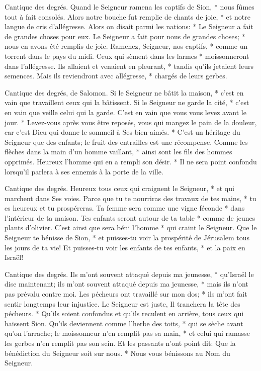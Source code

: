 Cantique des degrés. Quand le Seigneur ramena les captifs de Sion, * nous fûmes tout à fait consolés.
Alors notre bouche fut remplie de chants de joie, * et notre langue de cris d'allégresse. Alors on disait parmi les nations: * Le Seigneur a fait de grandes choses pour eux.
Le Seigneur a fait pour nous de grandes choses; * nous en avons été remplis de joie.
Ramenez, Seigneur, nos captifs, * comme un torrent dans le pays du midi.
Ceux qui sèment dans les larmes * moissonneront dans l'allégresse.
Ils allaient et venaient en pleurant, * tandis qu'ils jetaient leurs semences. Mais ils reviendront avec allégresse, * chargés de leurs gerbes.

Cantique des degrés, de Salomon. Si le Seigneur ne bâtit la maison, * c'est en vain que travaillent ceux qui la bâtissent. Si le Seigneur ne garde la cité, * c'est en vain que veille celui qui la garde.
C'est en vain que vous vous levez avant le jour. * Levez-vous après vous être reposés, vous qui mangez le pain de la douleur, car c'est Dieu qui donne le sommeil à Ses bien-aimés. *
C'est un héritage du Seigneur que des enfants; le fruit des entrailles est une récompense.
Comme les flèches dans la main d'un homme vaillant, * ainsi sont les fils des hommes opprimés.
Heureux l'homme qui en a rempli son désir. * Il ne sera point confondu lorsqu'il parlera à ses ennemis à la porte de la ville.

Cantique des degrés. Heureux tous ceux qui craignent le Seigneur, * et qui marchent dans Ses voies.
Parce que tu te nourriras des travaux de tes mains, * tu es heureux et tu prospéreras.
Ta femme sera comme une vigne féconde * dans l'intérieur de ta maison. Tes enfants seront autour de ta table * comme de jeunes plants d'olivier.
C'est ainsi que sera béni l'homme * qui craint le Seigneur.
Que le Seigneur te bénisse de Sion, * et puisses-tu voir la prospérité de Jérusalem tous les jours de ta vie!
Et puisses-tu voir les enfants de tes enfants, * et la paix en Israël!

Cantique des degrés. Ils m'ont souvent attaqué depuis ma jeunesse, * qu'Israël le dise maintenant;
ils m'ont souvent attaqué depuis ma jeunesse, * mais ils n'ont pas prévalu contre moi.
Les pécheurs ont travaillé sur mon dos; * ils m'ont fait sentir longtemps leur injustice.
Le Seigneur est juste, Il tranchera la tête des pécheurs. *
Qu'ils soient confondus et qu'ils reculent en arrière, tous ceux qui haïssent Sion.
Qu'ils deviennent comme l'herbe des toits, * qui se sèche avant qu'on l'arrache;
le moissonneur n'en remplit pas sa main, * et celui qui ramasse les gerbes n'en remplit pas son sein.
Et les passants n'ont point dit: Que la bénédiction du Seigneur soit sur nous. * Nous vous bénissons au Nom du Seigneur.

